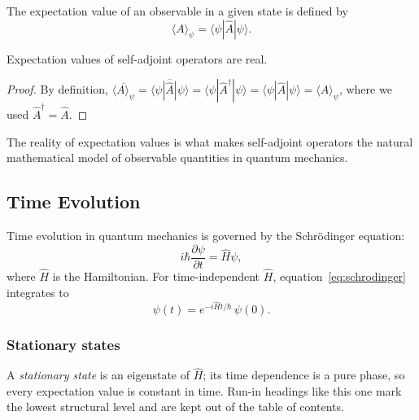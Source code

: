 \documentclass[a4paper,11pt]{article}
\begin{document}
The expectation value of an observable in a given state is defined by
\begin{equation}
  \langle A \rangle_\psi
  = \langle \psi | \hat{A} | \psi \rangle .
  \label{eq:expectation}
\end{equation}

\begin{mainresult}
\begin{theorem}
  Expectation values of self-adjoint operators are real.
\end{theorem}
\end{mainresult}

\begin{proof}
  By definition,
  $\overline{\langle A \rangle_\psi}
  = \overline{\langle \psi | \hat{A} | \psi \rangle}
  = \langle \psi | \hat{A}^\dagger | \psi \rangle
  = \langle \psi | \hat{A} | \psi \rangle
  = \langle A \rangle_\psi$,
  where we used $\hat{A}^\dagger = \hat{A}$.
\end{proof}

\begin{remark}
  The reality of expectation values is what makes self-adjoint
  operators the natural mathematical model of observable quantities
  in quantum mechanics.
\end{remark}

\subsection{Time Evolution}

Time evolution in quantum mechanics is governed by the
Schr\"odinger equation:
\begin{equation}
  i\hbar \frac{\partial \psi}{\partial t}
  = \hat{H}\psi ,
  \label{eq:schrodinger}
\end{equation}
where $\hat{H}$ is the Hamiltonian. For time-independent
$\hat{H}$, equation~\eqref{eq:schrodinger} integrates to
\begin{equation}
  \psi(t) = e^{-i\hat{H}t/\hbar}\,\psi(0).
\end{equation}

\subsubsection{Stationary states}
A \emph{stationary state} is an eigenstate of $\hat{H}$; its time
dependence is a pure phase, so every expectation value is constant
in time. Run-in headings like this one mark the lowest structural
level and are kept out of the table of contents.
\end{document}

